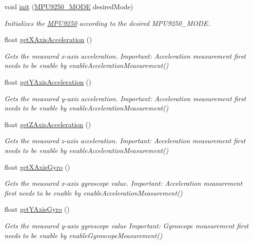 \begin{DoxyCompactItemize}
\item 
void \hyperlink{class_m_p_u9250_ac96395ed9e9f763013ea9174011780d0}{init} (\hyperlink{_m_p_u9250_config_8h_a5e7bb14760657986206f4a28ef647252}{M\+P\+U9250\+\_\+\+M\+O\+D\+E} desired\+Mode)
\begin{DoxyCompactList}\small\item\em Initializes the \hyperlink{class_m_p_u9250}{M\+P\+U9250} according to the desired M\+P\+U9250\+\_\+\+M\+O\+D\+E. \end{DoxyCompactList}\item 
float \hyperlink{class_m_p_u9250_a78a8d5b88d5c8d2f166c8ae12f6f65c7}{get\+X\+Axis\+Acceleration} ()
\begin{DoxyCompactList}\small\item\em Gets the measured x-\/axis acceleration. Important\+: Acceleration measurement first needs to be enable by enable\+Acceleration\+Measurement() \end{DoxyCompactList}\item 
float \hyperlink{class_m_p_u9250_a6a3c2609add724f45c3ab002b811e9ff}{get\+Y\+Axis\+Acceleration} ()
\begin{DoxyCompactList}\small\item\em Gets the measured y-\/axis acceleration. Important\+: Acceleration measurement first needs to be enable by enable\+Acceleration\+Measurement() \end{DoxyCompactList}\item 
float \hyperlink{class_m_p_u9250_a7b548ef3efef82135b4a65787c418239}{get\+Z\+Axis\+Acceleration} ()
\begin{DoxyCompactList}\small\item\em Gets the measured z-\/axis acceleration. Important\+: Acceleration measurement first needs to be enable by enable\+Acceleration\+Measurement() \end{DoxyCompactList}\item 
float \hyperlink{class_m_p_u9250_aabf4d6078a27f30a5fdf0e360016e610}{get\+X\+Axis\+Gyro} ()
\begin{DoxyCompactList}\small\item\em Gets the measured x-\/axis gyroscope value. Important\+: Acceleration measurement first needs to be enable by enable\+Acceleration\+Measurement() \end{DoxyCompactList}\item 
float \hyperlink{class_m_p_u9250_ac9b67040e9410f077ec7fc6d6fa29c6e}{get\+Y\+Axis\+Gyro} ()
\begin{DoxyCompactList}\small\item\em Gets the measured y-\/axis gyroscope value Important\+: Gyroscope measurement first needs to be enable by enable\+Gyroscope\+Measurement() \end{DoxyCompactList}\item 

\end{DoxyCompactItemize}
